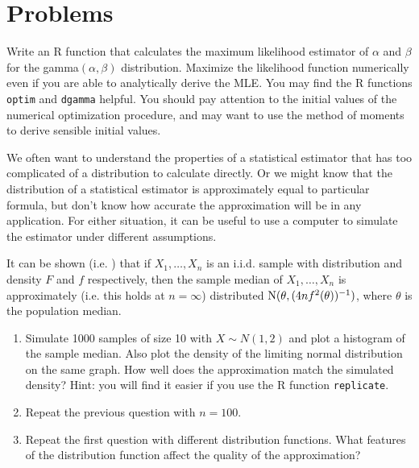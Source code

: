 

\chapter{Problems}

\begin{hw}
  Write an R function that calculates the maximum likelihood
  estimator of $\alpha$ and $\beta$ for the gamma$(\alpha,\beta)$
  distribution. Maximize the likelihood function numerically even if
  you are able to analytically derive the MLE. You may find the R
  functions \texttt{optim} and \texttt{dgamma} helpful. You should
  pay attention to the initial values of the numerical optimization
  procedure, and may want to use the method of moments to derive
  sensible initial values.
\end{hw}

\begin{hw}
  We often want to understand the properties of a statistical
  estimator that has too complicated of a distribution to calculate
  directly. Or we might know that the distribution of a statistical
  estimator is approximately equal to particular formula, but don't
  know how accurate the approximation will be in any application. For
  either situation, it can be useful to use a computer to simulate the
  estimator under different assumptions.

  It can be shown (i.e. \citet[p. 483]{CB02}) that if $X_1,\dots,X_n$
  is an i.i.d. sample with distribution and density $F$ and $f$
  respectively, then the sample median of $X_1,\dots,X_n$ is
  approximately (i.e. this holds at $n = \infty$) distributed $\operatorname{N}(\theta,
  (4 n f^2(\theta))^{-1})$, where $\theta$ is the population median.
  \begin{enumerate}
  \item Simulate 1000 samples of size 10 with $X \sim N(1,2)$ and plot
    a histogram of the sample median. Also plot the density of the
    limiting normal distribution on the same graph. How well does the
    approximation match the simulated density? Hint: you will find it
    easier if you use the R function \texttt{replicate}.
  \item Repeat the previous question with $n=100$.
  \item Repeat the first question with different distribution
    functions. What features of the distribution function affect the
    quality of the approximation?
  \end{enumerate}
\end{hw}

